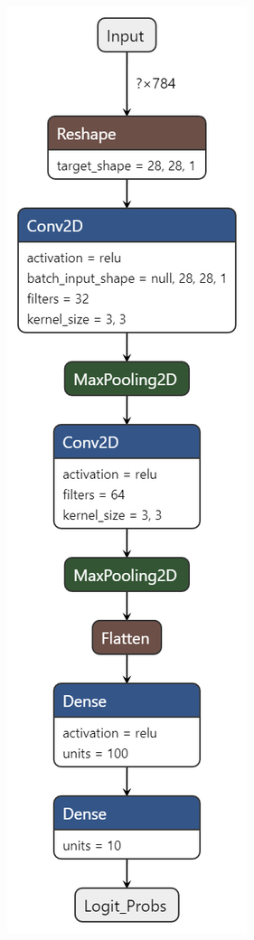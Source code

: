 \documentclass[11pt]{article}
\begin{document}
\pagebreak
\begin{figure}[H]
    \centering
    \begin{subfigure}[c]{0.24\textwidth}
        \centering
        \includegraphics[width = \textwidth]{conv3.png}

\end{subfigure}
\end{figure}
\end{document}
